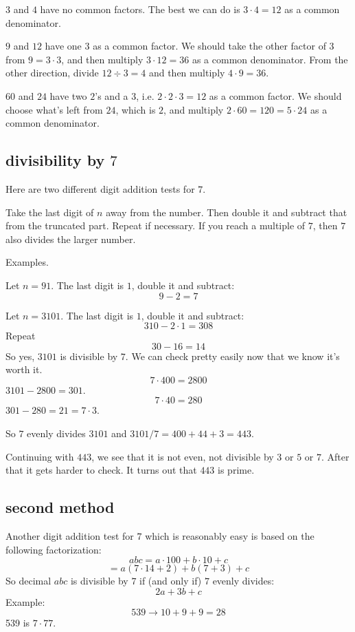 \documentclass[11pt, oneside]{article}
\begin{document}
$3$ and $4$ have no common factors.  The best we can do is $3 \cdot 4 = 12$ as a common denominator. 

$9$ and $12$ have one $3$ as a common factor.  We should take the other factor of $3$ from $9 = 3 \cdot 3$, and then multiply $3 \cdot 12 = 36$ as a common denominator.  From the other direction, divide $12 \div 3 = 4$ and then multiply $4 \cdot 9 = 36$.

$60$ and $24$ have two $2$'s and a $3$, i.e. $2 \cdot 2 \cdot 3 = 12$ as a common factor.  We should choose what's left from $24$, which is $2$, and multiply $2 \cdot 60 = 120 =  5 \cdot 24$ as a common denominator.  

\subsection*{divisibility by $7$}

Here are two different digit addition tests for $7$.  

Take the last digit of $n$ away from the number.  Then double it and subtract that from the truncated part.  Repeat if necessary.  If you reach a multiple of $7$, then $7$ also divides the larger number.

Examples.

Let $n = 91$.  The last digit is $1$, double it and subtract:
\[ 9 - 2 = 7 \]

Let $n = 3101$.  The last digit is $1$, double it and subtract:
\[ 310 - 2 \cdot 1 = 308 \]
Repeat
\[ 30 - 16 = 14 \]
So yes, $3101$ is divisible by $7$.  We can check pretty easily now that we know it's worth it.
\[ 7 \cdot 400 = 2800 \]
$3101 - 2800 = 301$.
\[ 7 \cdot 40 = 280 \]
$301 - 280 = 21 = 7 \cdot 3$.

So $7$ evenly divides $3101$ and $3101/7 = 400 + 44 + 3 = 443$.

Continuing with $443$, we see that it is not even, not divisible by $3$ or $5$ or $7$.  After that it gets harder to check.  It turns out that $443$ is prime.

\subsection*{second method}
Another digit addition test for $7$ which is reasonably easy is based on the following factorization:
\[ abc = a \cdot 100 + b \cdot 10 + c \]
\[ = a(7 \cdot 14 + 2) + b(7 + 3) + c \]
So decimal $abc$ is divisible by $7$ if (and only if) $7$ evenly divides:
\[ 2a + 3b + c \]
Example:
\[ 539 \rightarrow 10 + 9 + 9 = 28 \]
539 is $7 \cdot 77$.
\end{document}
